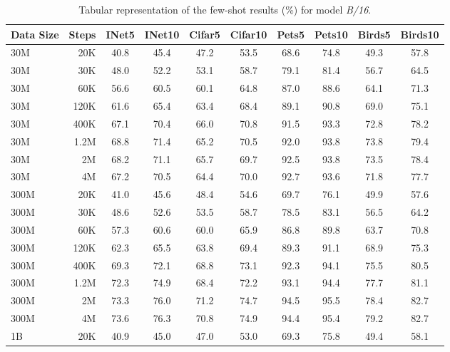 \begin{table}[t]
  \setlength{\tabcolsep}{5pt}
  \setlength{\extrarowheight}{5pt}
  \renewcommand{\arraystretch}{0.75}
  \centering
  \caption{Tabular representation of the few-shot results (\%) for model \emph{B/16}.}\label{tbl:b_16}
  \begin{tabulary}{1.0\textwidth}{l r c c c c c c c c}
    \toprule[1pt]
    \bf{Data Size} & \bf{Steps} & \bf{INet5} & \bf{INet10} & \bf{Cifar5} & \bf{Cifar10} & \bf{Pets5} & \bf{Pets10} & \bf{Birds5} & \bf{Birds10} \\
    \midrule
30M   & 20K   & 40.8 & 45.4 & 47.2 & 53.5 & 68.6 & 74.8 & 49.3 & 57.8 \\
30M   & 30K   & 48.0 & 52.2 & 53.1 & 58.7 & 79.1 & 81.4 & 56.7 & 64.5 \\
30M   & 60K   & 56.6 & 60.5 & 60.1 & 64.8 & 87.0 & 88.6 & 64.1 & 71.3 \\
30M   & 120K  & 61.6 & 65.4 & 63.4 & 68.4 & 89.1 & 90.8 & 69.0 & 75.1 \\
30M   & 400K  & 67.1 & 70.4 & 66.0 & 70.8 & 91.5 & 93.3 & 72.8 & 78.2 \\
30M   & 1.2M    & 68.8 & 71.4 & 65.2 & 70.5 & 92.0 & 93.8 & 73.8 & 79.4 \\
30M   & 2M    & 68.2 & 71.1 & 65.7 & 69.7 & 92.5 & 93.8 & 73.5 & 78.4 \\
30M   & 4M    & 67.2 & 70.5 & 64.4 & 70.0 & 92.7 & 93.6 & 71.8 & 77.7 \\
\midrule[0.25pt]
300M  & 20K   & 41.0 & 45.6 & 48.4 & 54.6 & 69.7 & 76.1 & 49.9 & 57.6 \\
300M  & 30K   & 48.6 & 52.6 & 53.5 & 58.7 & 78.5 & 83.1 & 56.5 & 64.2 \\
300M  & 60K   & 57.3 & 60.6 & 60.0 & 65.9 & 86.8 & 89.8 & 63.7 & 70.8 \\
300M  & 120K  & 62.3 & 65.5 & 63.8 & 69.4 & 89.3 & 91.1 & 68.9 & 75.3 \\
300M  & 400K  & 69.3 & 72.1 & 68.8 & 73.1 & 92.3 & 94.1 & 75.5 & 80.5 \\
300M  & 1.2M    & 72.3 & 74.9 & 68.4 & 72.2 & 93.1 & 94.4 & 77.7 & 81.1 \\
300M  & 2M    & 73.3 & 76.0 & 71.2 & 74.7 & 94.5 & 95.5 & 78.4 & 82.7 \\
300M  & 4M    & 73.6 & 76.3 & 70.8 & 74.9 & 94.4 & 95.4 & 79.2 & 82.7 \\
\midrule[0.25pt]
1B    & 20K   & 40.9 & 45.0 & 47.0 & 53.0 & 69.3 & 75.8 & 49.4 & 58.1 \\

\end{tabulary}
\end{table}
